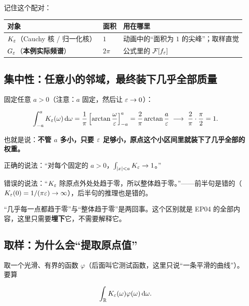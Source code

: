 记住这个配对：

\begin{center}
\small
\renewcommand{\arraystretch}{1.3}
\begin{tabularx}{\textwidth}{@{}L{5.4cm}L{1.8cm}Y@{}}
\toprule
对象 & 面积 & 用在哪里 \\
\midrule
$K_\varepsilon$（Cauchy 核 / 归一化核） & $1$ & 动画中的“面积为 $1$ 的尖峰”；取样直觉 \\
$G_\varepsilon$（\textbf{本例实际频谱}） & $2\pi$ & 公式里的 $\mathcal{F}[f_\varepsilon]$ \\
\bottomrule
\end{tabularx}
\end{center}

\subsection{集中性：任意小的邻域，最终装下几乎全部质量}

固定任意 $a>0$（注意：$a$ 固定，然后让 $\varepsilon\to0$）：

\begin{equation}
\int_{-a}^{a}K_\varepsilon(\omega)\mathop{}\!\mathrm{d}\omega
=\frac{1}{\pi}\left[\arctan\frac{\omega}{\varepsilon}\right]_{-a}^{a}
=\frac{2}{\pi}\arctan\frac{a}{\varepsilon}
\;\longrightarrow\;\frac{2}{\pi}\cdot\frac{\pi}{2}=1 .
\end{equation}

也就是说：\textbf{不管 $a$ 多小，只要 $\varepsilon$ 足够小，原点这个小区间里就装下了几乎全部的权重。}

\begin{ideabox}[这句话要说得非常小心]
正确的说法：“对每个固定的 $a>0$，$\int_{|x|<a}K_\varepsilon\to1$。”

错误的说法：“$K_\varepsilon$ 除原点外处处趋于零，所以整体趋于零。”——前半句是错的（$K_\varepsilon(0)=1/(\pi\varepsilon)\to\infty$），后半句的推理也是错的。

“几乎每一点都趋于零”与“整体趋于零”是两回事。这个区别就是 EP04 的全部内容，这里只需要\textbf{埋下}它，不需要解释它。
\end{ideabox}

\subsection{取样：为什么会“提取原点值”}

取一个光滑、有界的函数 $\varphi$（后面叫它测试函数，这里只说“一条平滑的曲线”）。要算

\begin{equation}
\int_{\mathbb{R}}K_\varepsilon(\omega)\varphi(\omega)\mathop{}\!\mathrm{d}\omega .
\end{equation}

